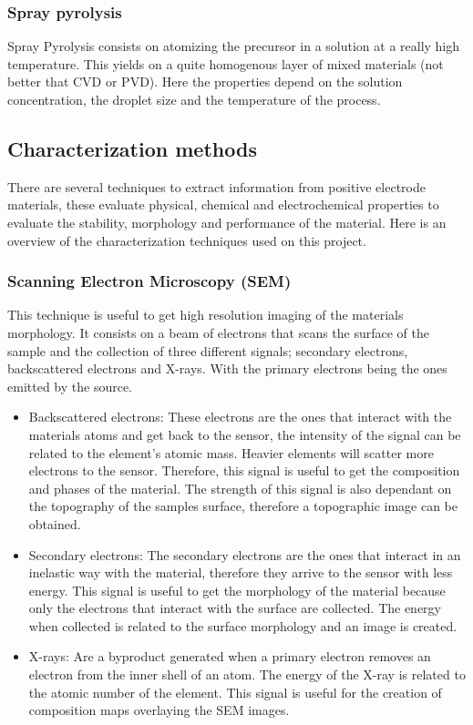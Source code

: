 \documentclass{article}
\begin{document}
\subsubsection{Spray pyrolysis}
Spray Pyrolysis consists on atomizing the precursor in a solution at a really high temperature. This yields on a 
quite homogenous layer of mixed materials (not better that CVD or PVD). Here the properties depend on the solution concentration, the 
droplet size and the temperature of the process\cite{process}.

\subsection{Characterization methods}
There are several techniques to extract information from positive electrode materials,
these evaluate physical, chemical and electrochemical properties to evaluate the stability, morphology 
and performance of the material. Here is an overview of the characterization techniques used on this project.\\
\subsubsection{Scanning Electron Microscopy (SEM)}
This technique is useful to get high resolution imaging of the materials morphology.
It consists on a beam of electrons that scans the surface of the sample and the collection of three 
different signals; secondary electrons, backscattered electrons and X-rays. With the primary electrons 
being the ones emitted by the source.\\
\begin {itemize}
\item Backscattered electrons: These electrons are the ones that interact with the materials atoms and get back to
the sensor, the intensity of the signal can be related to the element's atomic mass. Heavier elements will scatter more electrons
to the sensor. Therefore, this signal is useful to get the composition and phases of the material.
The strength of this signal is also dependant on the topography of the samples surface, therefore a topographic image can be obtained.\\
\item Secondary electrons: The secondary electrons are the ones that interact in an inelastic way with the material, therefore they arrive to
the sensor with less energy. This signal is useful to get the morphology of the material because only the electrons that interact with the surface
are collected. The energy when collected is related to the surface morphology and an image is created.\\
\item X-rays: Are a byproduct generated when a primary electron removes an electron from the inner shell of an atom. The energy of the X-ray is related to the
atomic number of the element. This signal is useful for the creation of composition maps overlaying the 
SEM images.\\
\end{itemize}
\end{document}
